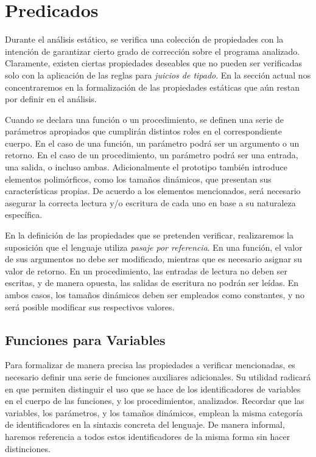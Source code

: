 \section{Predicados}

Durante el análisis estático, se verifica una colección de propiedades con la intención de garantizar cierto grado de corrección sobre el programa analizado.
Claramente, existen ciertas propiedades deseables que no pueden ser verificadas solo con la aplicación de las reglas para \textit{juicios de tipado}.
En la sección actual nos concentraremos en la formalización de las propiedades estáticas que aún restan por definir en el análisis.

Cuando se declara una función o un procedimiento, se definen una serie de parámetros apropiados que cumplirán distintos roles en el correspondiente cuerpo.
En el caso de una función, un parámetro podrá ser un argumento o un retorno.
En el caso de un procedimiento, un parámetro podrá ser una entrada, una salida, o incluso ambas.
Adicionalmente el prototipo también introduce elementos polimórficos, como los tamaños dinámicos, que presentan sus características propias.
De acuerdo a los elementos mencionados, será necesario asegurar la correcta lectura y/o escritura de cada uno en base a su naturaleza específica.

En la definición de las propiedades que se pretenden verificar, realizaremos la suposición que el lenguaje utiliza \textit{pasaje por referencia}.
En una función, el valor de sus argumentos no debe ser modificado, mientras que es necesario asignar su valor de retorno.
En un procedimiento, las entradas de lectura no deben ser escritas, y de manera opuesta, las salidas de escritura no podrán ser leídas.
En ambos casos, los tamaños dinámicos deben ser empleados como constantes, y no será posible modificar sus respectivos valores.

\subsection{Funciones para Variables}

Para formalizar de manera precisa las propiedades a verificar mencionadas, es necesario definir una serie de funciones auxiliares adicionales.
Su utilidad radicará en que permiten distinguir el uso que se hace de los identificadores de variables en el cuerpo de las funciones, y los procedimientos, analizados.
Recordar que las variables, los parámetros, y los tamaños dinámicos, emplean la misma categoría de identificadores en la sintaxis concreta del lenguaje.
De manera informal, haremos referencia a todos estos identificadores de la misma forma sin hacer distinciones.

